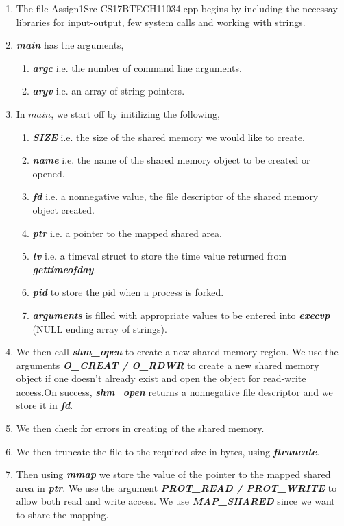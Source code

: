\documentclass[a4paper,12pt]{report}
\begin{document}
\begin{enumerate}
\item The file Assign1Src-CS17BTECH11034.cpp begins by including the necessay libraries for input-output, few system calls and working with strings.
\item \textbf{\textit{main}} has the arguments,
\begin{enumerate}
\item \textbf{\textit{argc}} i.e. the number of command line arguments.
\item \textbf{\textit{argv}} i.e. an array of string pointers.
\end{enumerate}
\item In $main$, we start off by initilizing the following,
\begin{enumerate}
\item \textbf{\textit{SIZE}} i.e. the size of the shared memory we would like to create.
\item \textbf{\textit{name}} i.e. the name of the shared memory object to be created or opened.
\item \textbf{\textit{fd}} i.e. a nonnegative value, the file descriptor of the shared memory object created.
\item \textbf{\textit{ptr}} i.e. a pointer to the mapped shared area.
\item \textbf{\textit{tv}} i.e. a timeval struct to store the time value returned from \textbf{\textit{gettimeofday}}.
\item\textbf{ \textit{pid}} to store the pid when a process is forked.
\item \textit{\textbf{arguments}} is filled with appropriate values to be entered into \textbf{\textit{execvp}} (NULL ending array of strings).
\end{enumerate}
\item We then call \textbf{\textit{shm\_open}} to create a new shared memory region. We use the arguments \textbf{\textit{O\_CREAT / O\_RDWR}} to create a new shared memory object if one doesn't already exist and open the object for read-write access.On success, \textbf{\textit{shm\_open}} returns a nonnegative file descriptor and we store it in \textbf{\textit{fd}}.
\item We then check for errors in creating of the shared memory.
\item We then truncate the file to the required size in bytes, using \textbf{\textit{ftruncate}}.
\item Then using \textbf{\textit{mmap}} we store the value of the pointer to the mapped shared area in \textbf{\textit{ptr}}. We use the argument \textbf{\textit{PROT\_READ / PROT\_WRITE}} to allow both read and write access. We use \textbf{\textit{MAP\_SHARED}} since we want to share the mapping.

\end{enumerate}
\end{document}
